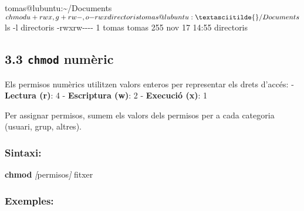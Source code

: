 \documentclass[
  a4paper,
]{article}
\newenvironment{Shaded}{\begin{snugshade}}{\end{snugshade}}
\newcommand{\AttributeTok}[1]{\textcolor[rgb]{0.13,0.29,0.53}{#1}}
\newcommand{\ExtensionTok}[1]{#1}
\newcommand{\FunctionTok}[1]{\textcolor[rgb]{0.13,0.29,0.53}{\textbf{#1}}}
\newcommand{\NormalTok}[1]{#1}
\newcommand{\PreprocessorTok}[1]{\textcolor[rgb]{0.56,0.35,0.01}{\textit{#1}}}
\newcommand{\SpecialStringTok}[1]{\textcolor[rgb]{0.31,0.60,0.02}{#1}}
\begin{document}
\begin{Shaded}
\begin{Highlighting}[]
\ExtensionTok{tomas@lubuntu:\textasciitilde{}/Documents$}\NormalTok{ chmod u+rwx,g+rw{-},o{-}rwx directoris}
\ExtensionTok{tomas@lubuntu:\textasciitilde{}/Documents$}\NormalTok{ ls }\AttributeTok{{-}l}\NormalTok{ directoris }
\ExtensionTok{{-}rwxrw{-}{-}{-}{-}}\NormalTok{ 1 tomas tomas 255 nov 17 14:55 directoris}
\end{Highlighting}
\end{Shaded}

\subsection{\texorpdfstring{3.3 \texttt{chmod}
numèric}{3.3 chmod numèric}}\label{chmod-numuxe8ric}

Els permisos numèrics utilitzen valors enteros per representar els drets
d'accés: - \textbf{Lectura (r)}: 4 - \textbf{Escriptura (w)}: 2 -
\textbf{Execució (x)}: 1

Per assignar permisos, sumem els valors dels permisos per a cada
categoria (usuari, grup, altres).

\subsubsection{Sintaxi:}\label{sintaxi-1}

\begin{Shaded}
\begin{Highlighting}[]
\FunctionTok{chmod} \PreprocessorTok{[}\SpecialStringTok{permisos}\PreprocessorTok{]}\NormalTok{ fitxer}
\end{Highlighting}
\end{Shaded}

\subsubsection{Exemples:}\label{exemples-1}
\end{document}
